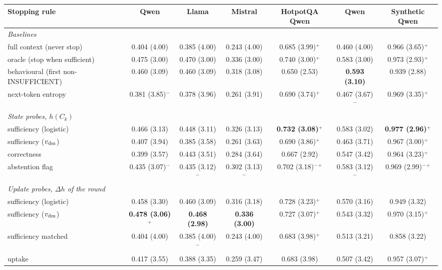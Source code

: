 \begin{tabular}{lcccccc}
\toprule
Stopping rule & \musique{} Qwen & \musique{} Llama & \musique{} Mistral & HotpotQA Qwen & \twowiki{} Qwen & Synthetic Qwen \\
\midrule
\multicolumn{7}{l}{\emph{Baselines}} \\
\quad full context (never stop) & 0.404 (4.00) & 0.385 (4.00) & 0.243 (4.00) & 0.685 (3.99)$^{+}$ & 0.460 (4.00) & 0.966 (3.65)$^{+}$ \\
\quad oracle (stop when sufficient) & 0.475 (3.00) & 0.470 (3.00) & 0.336 (3.00) & 0.740 (3.00)$^{+}$ & 0.583 (3.00) & 0.973 (2.93)$^{+}$ \\
\quad behavioural (first non-INSUFFICIENT) & 0.460 (3.09) & 0.460 (3.09) & 0.318 (3.08) & 0.650 (2.53) & \textbf{0.593 (3.10)} & 0.939 (2.88) \\
\quad next-token entropy & 0.381 (3.85)$^{-}$ & 0.378 (3.96) & 0.261 (3.91) & 0.690 (3.74)$^{+}$ & 0.467 (3.67)$^{-}$ & 0.969 (3.35)$^{+}$ \\
\multicolumn{7}{l}{\emph{State probes, $h(C_k)$}} \\
\quad sufficiency (logistic) & 0.466 (3.13) & 0.448 (3.11) & 0.326 (3.13) & \textbf{0.732 (3.08)$^{+}$} & 0.583 (3.02) & \textbf{0.977 (2.96)$^{+}$} \\
\quad sufficiency ($v_{\mathrm{dm}}$) & 0.407 (3.94) & 0.385 (3.58) & 0.261 (3.63) & 0.690 (3.86)$^{+}$ & 0.463 (3.71) & 0.967 (3.00)$^{+}$ \\
\quad correctness & 0.399 (3.57) & 0.443 (3.51) & 0.284 (3.64) & 0.667 (2.92) & 0.547 (3.42) & 0.964 (3.23)$^{+}$ \\
\quad abstention flag & 0.435 (3.07)$^{-}$ & 0.435 (3.12)$^{-}$ & 0.302 (3.13)$^{-}$ & 0.702 (3.18)$^{-}$$^{+}$ & 0.583 (3.12)$^{-}$ & 0.969 (2.99)$^{-}$$^{+}$ \\
\multicolumn{7}{l}{\emph{Update probes, $\Delta h$ of the round}} \\
\quad sufficiency (logistic) & 0.458 (3.30) & 0.460 (3.09) & 0.316 (3.18) & 0.728 (3.23)$^{+}$ & 0.570 (3.16) & 0.949 (3.32) \\
\quad sufficiency ($v_{\mathrm{dm}}$) & \textbf{0.478 (3.06)$^{+}$} & \textbf{0.468 (2.98)} & \textbf{0.336 (3.00)} & 0.727 (3.07)$^{+}$ & 0.543 (3.32) & 0.970 (3.15)$^{+}$ \\
\quad sufficiency matched & 0.404 (4.00) & 0.385 (4.00)$^{-}$ & 0.243 (4.00) & 0.683 (3.98)$^{+}$ & 0.513 (3.21) & 0.858 (3.22) \\
\quad uptake & 0.417 (3.55) & 0.388 (3.35) & 0.259 (3.47) & 0.683 (3.98) & 0.507 (3.42) & 0.957 (3.07)$^{+}$ \\

\end{tabular}

